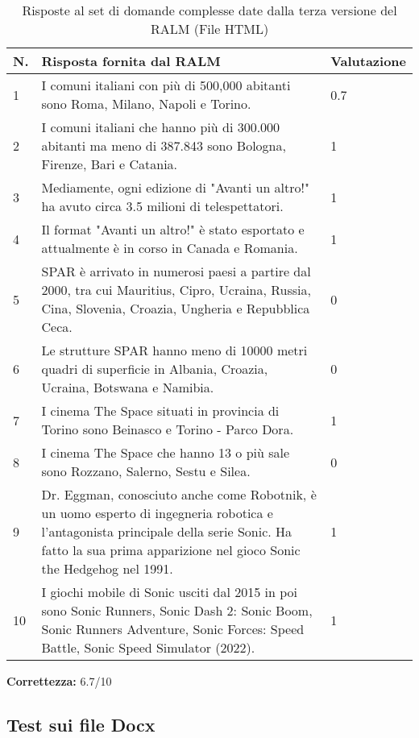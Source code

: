 \begin{table}[H]
    \centering
    \begin{tabular}{|p{0.5cm} |p{6cm} |p{2cm}|}
        \hline
        \textbf{N}. & \textbf{Risposta fornita dal RALM} & \textbf{Valutazione} \\
        \hline
        1 & I comuni italiani con più di 500,000 abitanti sono Roma, Milano, Napoli e Torino. & 0.7 \\
        \hline
        2 & I comuni italiani che hanno più di 300.000 abitanti ma meno di 387.843 sono Bologna, Firenze, Bari e Catania. & 1 \\
        \hline
        3 & Mediamente, ogni edizione di "Avanti un altro!" ha avuto circa 3.5 milioni di telespettatori. & 1 \\
        \hline
        4 & Il format "Avanti un altro!" è stato esportato e attualmente è in corso in Canada e Romania. & 1 \\
        \hline
        5 & SPAR è arrivato in numerosi paesi a partire dal 2000, tra cui Mauritius, Cipro, Ucraina, Russia, Cina, Slovenia, Croazia, Ungheria e Repubblica Ceca. & 0 \\
        \hline
        6 & Le strutture SPAR hanno meno di 10000 metri quadri di superficie in Albania, Croazia, Ucraina, Botswana e Namibia. & 0 \\
        \hline
        7 & I cinema The Space situati in provincia di Torino sono Beinasco e Torino - Parco Dora. & 1 \\
        \hline
        8 & I cinema The Space che hanno 13 o più sale sono Rozzano, Salerno, Sestu e Silea. & 0 \\
        \hline
        9 & Dr. Eggman, conosciuto anche come Robotnik, è un uomo esperto di ingegneria robotica e l'antagonista principale della serie Sonic. Ha fatto la sua prima apparizione nel gioco Sonic the Hedgehog nel 1991.  & 1 \\
        \hline
        10 & I giochi mobile di Sonic usciti dal 2015 in poi sono Sonic Runners, Sonic Dash 2: Sonic Boom, Sonic Runners Adventure, Sonic Forces: Speed Battle, Sonic Speed Simulator (2022). & 1 \\
        \hline
    \end{tabular}
    \caption{Risposte al set di domande complesse date dalla terza versione del RALM (File HTML)}
\end{table}

\textbf{Correttezza:} 6.7/10

\subsection{Test sui file Docx}

